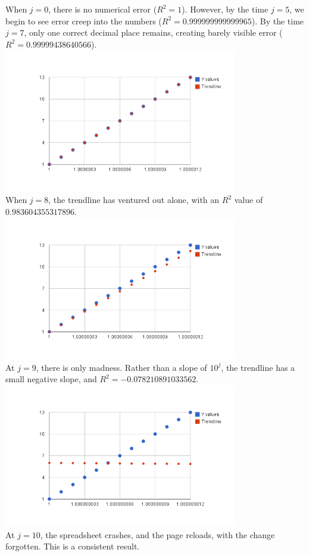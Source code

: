 \documentclass{article}
\begin{document}
\newpage
When $j=0$, there is no numerical error ($R^2=1$).
However, by the time $j=5$, we begin to see error creep into the numbers ($R^2 = 0.999999999999965$).
By the time $j=7$, only one correct decimal place remains,
creating barely visible error ($R^2=0.99999438640566$).\\
\includegraphics[width=4in]{TRENDj7.png}\\
When $j=8$, the trendline has ventured out alone, with an $R^2$ value of $0.983604355317896$.\\
\includegraphics[width=4in]{TRENDj8.png}\\
\newpage
At $j=9$, there is only madness.  Rather than a slope of $10^{j}$,
the trendline has a small negative slope, and $R^2 =-0.078210891033562$.\\
\includegraphics[width=4in]{TRENDj9.png}\\
At $j=10$, the spreadsheet crashes, and the page reloads,
with the change forgotten.  This is a consistent result.\\
\end{document}
